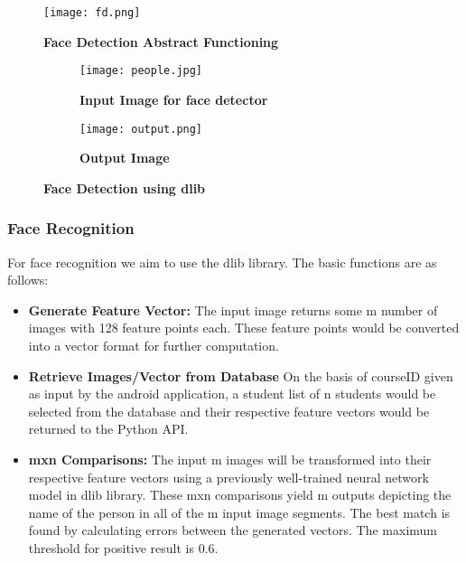 \documentclass{article}
\begin{document}
\begin{figure}[H]
\begin{center}
\texttt{[image: fd.png]}
\caption{\textbf{Face Detection Abstract Functioning}}
\label{Fig:diag1}
\end{center}
\end{figure}

\begin{figure}[H]
\begin{center}
	\begin{subfigure}[b]{\textwidth}
	\texttt{[image: people.jpg]}
	\caption{\textbf{Input Image for face detector}}
	\label{Fig:diag2_1}
	\end{subfigure}
	
	\begin{subfigure}[b]{\textwidth}
	\texttt{[image: output.png]}
	\caption{\textbf{Output Image}}
	\label{Fig:diag2_2}
	\end{subfigure}
	\caption{\textbf{Face Detection using dlib}}
\end{center}
\end{figure}

\newpage

\subsubsection{Face Recognition} For face recognition we aim to use the dlib library. The basic functions are as follows:
\begin{itemize}
\item \textbf{Generate Feature Vector:} The input image returns some m number of images with 128 feature points each. These feature points would be converted into a vector format for further computation.
\item \textbf{Retrieve Images/Vector from Database} On the basis of courseID given as input by the android application, a student list of n students would be selected from the database and their respective feature vectors would be returned to the Python API.
\item \textbf{mxn Comparisons:} The input m images will be transformed into their respective feature vectors using a previously well-trained neural network model in dlib library. These mxn comparisons yield m outputs depicting the name of the person in all of the m input image segments. The best match is found by calculating errors between the generated vectors. The maximum threshold for positive result is 0.6.
\end{itemize}
\end{document}
